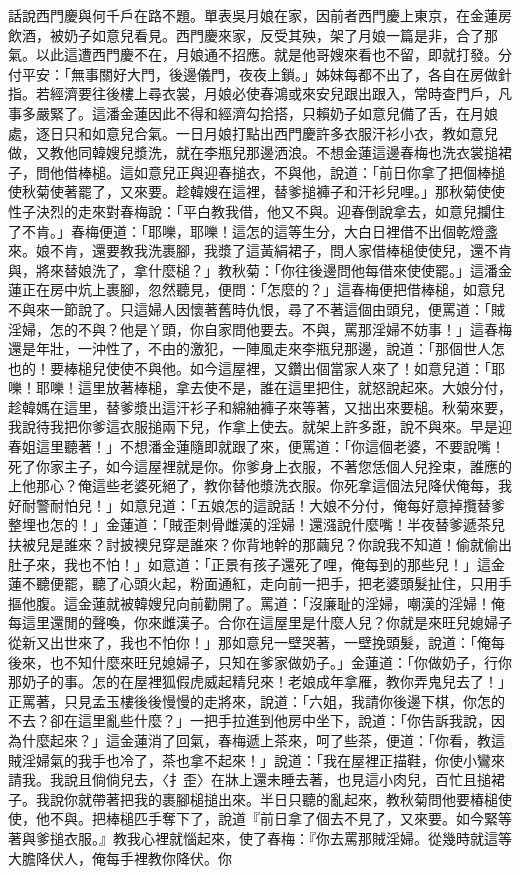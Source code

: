 \begin{showcontents}{}
話說西門慶與何千戶在路不題。單表吳月娘在家，因前者西門慶上東京，在金蓮房飲酒，被奶子如意兒看見。西門慶來家，反受其殃，架了月娘一篇是非，合了那氣。以此這遭西門慶不在，月娘通不招應。就是他哥嫂來看也不留，即就打發。分付平安：「無事關好大門，後邊儀門，夜夜上鎖。」姊妹每都不出了，各自在房做針指。若經濟要往後樓上尋衣裳，月娘必使春鴻或來安兒跟出跟入，常時查門戶，凡事多嚴緊了。這潘金蓮因此不得和經濟勾拾搭，只賴奶子如意兒備了舌，在月娘處，逐日只和如意兒合氣。一日月娘打點出西門慶許多衣服汗衫小衣，教如意兒做，又教他同韓嫂兒漿洗，就在李瓶兒那邊洒浪。不想金蓮這邊春梅也洗衣裳搥裙子，問他借棒槌。這如意兒正與迎春搥衣，不與他，說道：「前日你拿了把個棒搥使秋菊使著罷了，又來要。趁韓嫂在這裡，替爹搥褲子和汗衫兒哩。」那秋菊使使性子決烈的走來對春梅說：「平白教我借，他又不與。迎春倒說拿去，如意兒攔住了不肯。」春梅便道：「耶嚛，耶嚛！這怎的這等生分，大白日裡借不出個乾燈盞來。娘不肯，還要教我洗裹腳，我漿了這黃絹裙子，問人家借棒槌使使兒，還不肯與，將來替娘洗了，拿什麼槌？」教秋菊：「你往後邊問他每借來使使罷。」這潘金蓮正在房中炕上裹腳，忽然聽見，便問：「怎麼的？」這春梅便把借棒槌，如意兒不與來一節說了。只這婦人因懷著舊時仇恨，尋了不著這個由頭兒，便罵道：「賊淫婦，怎的不與？他是丫頭，你自家問他要去。不與，罵那淫婦不妨事！」這春梅還是年壯，一沖性了，不由的激犯，一陣風走來李瓶兒那邊，說道：「那個世人怎也的！要棒槌兒使使不與他。如今這屋裡，又鑽出個當家人來了！如意兒道：「耶嚛！耶嚛！這里放著棒槌，拿去使不是，誰在這里把住，就怒說起來。大娘分付，趁韓媽在這里，替爹漿出這汗衫子和綿紬褲子來等著，又拙出來要槌。秋菊來要，我說待我把你爹這衣服搥兩下兒，作拿上使去。就架上許多誑，說不與來。早是迎春姐這里聽著！」不想潘金蓮隨即就跟了來，便罵道：「你這個老婆，不要說嘴！死了你家主子，如今這屋裡就是你。你爹身上衣服，不著您恁個人兒拴束，誰應的上他那心？俺這些老婆死絕了，教你替他漿洗衣服。你死拿這個法兒降伏俺每，我好耐警耐怕兒！」如意兒道：「五娘怎的這說話！大娘不分付，俺每好意掉攬替爹整埋也怎的！」金蓮道：「賊歪刺骨雌漢的淫婦！還漒說什麼嘴！半夜替爹遞茶兒扶被兒是誰來？討披襖兒穿是誰來？你背地幹的那繭兒？你說我不知道！偷就偷出肚子來，我也不怕！」如意道：「正景有孩子還死了哩，俺每到的那些兒！」這金蓮不聽便罷，聽了心頭火起，粉面通紅，走向前一把手，把老婆頭髮扯住，只用手摳他腹。這金蓮就被韓嫂兒向前勸開了。罵道：「沒廉耻的淫婦，嘲漢的淫婦！俺每這里還閒的聲喚，你來雌漢子。合你在這屋里是什麼人兒？你就是來旺兒媳婦子從新又出世來了，我也不怕你！」那如意兒一壁哭著，一壁挽頭髮，說道：「俺每後來，也不知什麼來旺兒媳婦子，只知在爹家做奶子。」金蓮道：「你做奶子，行你那奶子的事。怎的在屋裡狐假虎威起精兒來！老娘成年拿雁，教你弄鬼兒去了！」正罵著，只見孟玉樓後後慢慢的走將來，說道：「六姐，我請你後邊下棋，你怎的不去？卻在這里亂些什麼？」一把手拉進到他房中坐下，說道：「你告訴我說，因為什麼起來？」這金蓮消了回氣，春梅遞上茶來，呵了些茶，便道：「你看，教這賊淫婦氣的我手也冷了，茶也拿不起來！」說道：「我在屋裡正描鞋，你使小鸞來請我。我說且倘倘兒去，〈扌歪〉在牀上還未睡去著，也見這小肉兒，百忙且搥裙子。我說你就帶著把我的裹腳槌搥出來。半日只聽的亂起來，教秋菊問他要椿槌使使，他不與。把棒槌匹手奪下了，說道『前日拿了個去不見了，又來要。如今緊等著與爹搥衣服。』教我心裡就惱起來，使了春梅：『你去罵那賊淫婦。從幾時就這等大膽降伏人，俺每手裡教你降伏。你
\end{showcontents}

